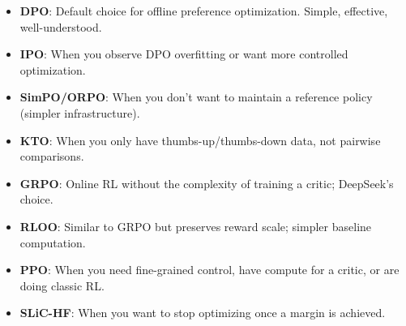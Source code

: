 \begin{itemize}
    \item \textbf{DPO}: Default choice for offline preference optimization. Simple, effective, well-understood.

    \item \textbf{IPO}: When you observe DPO overfitting or want more controlled optimization.

    \item \textbf{SimPO/ORPO}: When you don't want to maintain a reference policy (simpler infrastructure).

    \item \textbf{KTO}: When you only have thumbs-up/thumbs-down data, not pairwise comparisons.

    \item \textbf{GRPO}: Online RL without the complexity of training a critic; DeepSeek's choice.

    \item \textbf{RLOO}: Similar to GRPO but preserves reward scale; simpler baseline computation.

    \item \textbf{PPO}: When you need fine-grained control, have compute for a critic, or are doing classic RL.

    \item \textbf{SLiC-HF}: When you want to stop optimizing once a margin is achieved.
\end{itemize}
